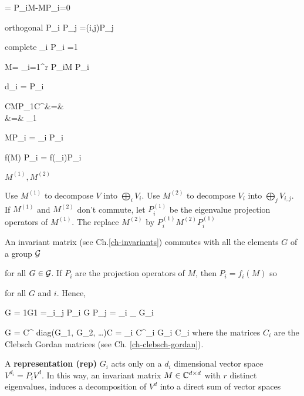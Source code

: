 \beq
[P_i, M]=
P_iM-MP_i=0
\eeq

orthogonal
\beq
P_i P_j =\delta(i,j)P_j
\eeq

complete
\beq
\sum_i P_i =1
\eeq

\beq
M= \sum_{i=1}^r
P_iM P_i
\eeq

\beq
d_i = \tr P_i
\eeq

\beqa
CMP_1C^\dagger &=&
\left[
\begin{array}{cc}
1&0
\\
0&0
\end{array}
\right] 
\\
&=&
\lam_1
\left[
\begin{array}{cc}
1&0
\\
0&0
\end{array}
\right] 
\eeqa

\beq
MP_i = \lam_i P_i \;
\eeq

\beq
f(M) P_i = f(\lam_i)P_i \;
\eeq

$M^{(1)}, M^{(2)}$

\eeq
Use $M^{(1)}$ to decompose $V$
into $\bigoplus_i V_i$.
Use  $M^{(2)}$ to decompose $V_i$ into
$\bigoplus_j V_{i,j}$. 
If $M^{(1)}$ and $M^{(2)}$ don't
commute, let $P^{(1)}_i$ be the eigenvalue 
projection operators of $M^{(1)}$. The replace $M^{(2)}$ by $P^{(1)}_i M^{(2)}P_i^{(1)}$

\eeq

An invariant matrix (see Ch.\ref{ch-invariants}) commutes with 
all the elements $G$ of a group ${\cal G}$

\eeq
for all $G\in{\cal G}$.
If $P_i$ are 
the projection operators of $M$, then $P_i=f_i(M)$ so

\eeq
for all $G$ and $i$.
Hence,

\beq
G = 1G1 =\sum_i\sum_j P_i G P_j
=
\sum_i _
{\eqdef G_i}
\eeq

\beq
G = C^\dagger 
diag(G_1, G_2, \ldots)C
=
\sum_i
C^\dagger_i
G_i C_i
\eeq
where the matrices $C_i$
are the Clebsch Gordan 
matrices (see Ch. \ref{ch-clebsch-gordan}).

A {\bf representation (rep)} $G_i$ acts only
on a $d_i$ dimensional vector space $V^{d_i}=P_i V^d$.
In this way, an invariant
matrix $M\in { \mathbb{C}}^{d\times d}$
with $r$ 
distinct eigenvalues,
induces a decomposition of $V^d$
into a direct sum of vector spaces

